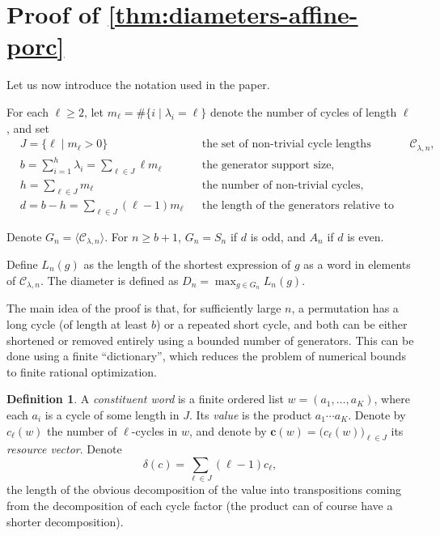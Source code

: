 \documentclass[DIV=12,10pt]{scrartcl}
\theoremstyle{definition}
\newtheorem{definition}{Definition}
\newcommand{\cvec}{\mathbf{c}}
\newcommand{\cc}{\mathcal{C}}
\begin{document}
\section{Proof of \cref{thm:diameters-affine-porc}}

Let us now introduce the notation used in the paper.

For each $\ell\geqslant 2$, let $m_\ell = \#\{i \mid \lambda_i=\ell\}$ denote the number of cycles of length $\ell$, and set
\begin{align*}
	& J = \{ \ell \mid m_\ell > 0 \} && \text{the set of non-trivial cycle lengths present in $\cc_{\lambda,n}$,} \\
	& b = \sum_{i=1}^h \lambda_i =\sum_{\ell\in J} \ell m_\ell && \text{the generator support size,} \\
	& h = \sum_{\ell\in J} m_\ell && \text{the number of non-trivial cycles,} \\
	& d = b-h = \sum_{\ell\in J} (\ell-1) m_\ell && \text{the length of the generators relative to all transpositions.}
\end{align*}

Denote $G_n = \langle \cc_{\lambda,n} \rangle$. For $n\geqslant b+1$, $G_n = S_n$ if $d$ is odd, and $A_n$ if $d$ is even.

Define $L_n(g)$ as the length of the shortest expression of $g$ as a word in elements of $\cc_{\lambda,n}$. The diameter is defined as $D_n = \max_{g\in G_n} L_n(g)$.

The main idea of the proof is that, for sufficiently large $n$, a permutation has a long cycle (of length at least $b$) or a repeated short cycle, and both can be either shortened or removed entirely using a bounded number of generators. This can be done using a finite ``dictionary'', which reduces the problem of numerical bounds to finite rational optimization.

\begin{definition}
A \emph{constituent word} is a finite ordered list $w=(a_1,\ldots,a_K)$, where each $a_i$ is a cycle of some length in $J$. Its \emph{value} is the product $a_1\cdots a_K$. Denote by $c_\ell(w)$ the number of $\ell$-cycles in $w$, and denote by $\cvec(w) = \big( c_\ell(w) \big)_{\ell\in J}$ its \emph{resource vector}. Denote
\[
\delta(c) = \sum_{\ell\in J} (\ell-1) c_\ell,
\]
the length of the obvious decomposition of the value into transpositions coming from the decomposition of each cycle factor (the product can of course have a shorter decomposition).
\end{definition}
\end{document}
